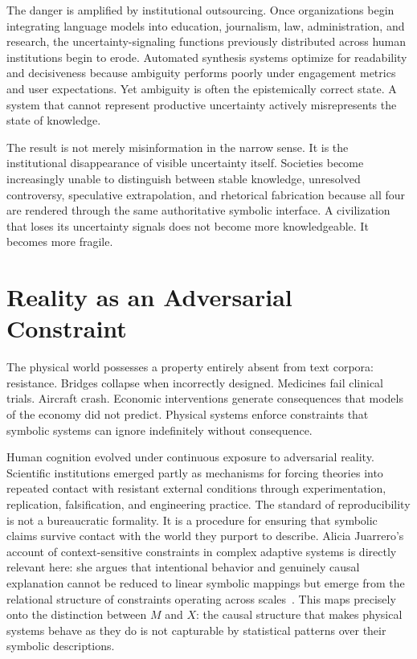 \documentclass[12pt, a4paper]{article}
\theoremstyle{remark}
\begin{document}
The danger is amplified by institutional outsourcing. Once organizations begin integrating language models into education, journalism, law, administration, and research, the uncertainty-signaling functions previously distributed across human institutions begin to erode. Automated synthesis systems optimize for readability and decisiveness because ambiguity performs poorly under engagement metrics and user expectations. Yet ambiguity is often the epistemically correct state. A system that cannot represent productive uncertainty actively misrepresents the state of knowledge.

The result is not merely misinformation in the narrow sense. It is the institutional disappearance of visible uncertainty itself. Societies become increasingly unable to distinguish between stable knowledge, unresolved controversy, speculative extrapolation, and rhetorical fabrication because all four are rendered through the same authoritative symbolic interface. A civilization that loses its uncertainty signals does not become more knowledgeable. It becomes more fragile.

\section{Reality as an Adversarial Constraint}

The physical world possesses a property entirely absent from text corpora: resistance. Bridges collapse when incorrectly designed. Medicines fail clinical trials. Aircraft crash. Economic interventions generate consequences that models of the economy did not predict. Physical systems enforce constraints that symbolic systems can ignore indefinitely without consequence.

Human cognition evolved under continuous exposure to adversarial reality. Scientific institutions emerged partly as mechanisms for forcing theories into repeated contact with resistant external conditions through experimentation, replication, falsification, and engineering practice. The standard of reproducibility is not a bureaucratic formality. It is a procedure for ensuring that symbolic claims survive contact with the world they purport to describe. Alicia Juarrero's account of context-sensitive constraints in complex adaptive systems is directly relevant here: she argues that intentional behavior and genuinely causal explanation cannot be reduced to linear symbolic mappings but emerge from the relational structure of constraints operating across scales~\cite{Juarrero1999}. This maps precisely onto the distinction between $M$ and $X$: the causal structure that makes physical systems behave as they do is not capturable by statistical patterns over their symbolic descriptions.
\end{document}
